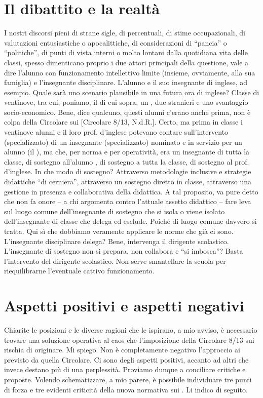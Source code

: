 \section*{Il dibattito e la realtà}
I nostri discorsi pieni di strane sigle, di percentuali, di stime occupazionali, di valutazioni entusiastiche o apocalittiche, di considerazioni di “pancia” o “politiche”, di punti di vista interni o molto lontani dalla quotidiana vita delle classi, spesso dimenticano proprio i due attori principali della questione, vale a dire l'alunno con funzionamento intellettivo limite (insieme, ovviamente, alla sua famiglia) e l'insegnante disciplinare.
L'alunno  e il suo insegnante di inglese, ad esempio. Quale sarà uno scenario plausibile in una futura ora di inglese? Classe di ventinove, tra cui, poniamo, il  di cui sopra, un , due stranieri e uno svantaggio socio-economico. Bene, dice qualcuno, questi alunni c'erano anche prima, non è colpa della Circolare sui  [Circolare 8/13, N.d.R.]. Certo, ma prima in classe i ventinove alunni e il loro prof. d'inglese potevano contare sull'intervento (specializzato) di un insegnante (specializzato) nominato e in servizio per un alunno (il ), ma che, per norma e per operatività, era un insegnante di tutta la classe, di sostegno all'alunno , di sostegno a tutta la classe, di sostegno al prof. d'inglese.
In che modo di sostegno? Attraverso metodologie inclusive e strategie didattiche “di cerniera”, attraverso un sostegno diretto in classe, attraverso una gestione in presenza e collaborativa della didattica.
A tal proposito, va pure detto che non fa onore – a chi argomenta contro l'attuale assetto didattico – fare leva sul luogo comune dell'insegnante di sostegno che si isola o viene isolato dell'insegnante di classe che delega ed esclude. Poiché di luogo comune davvero si tratta. Qui sì che dobbiamo veramente applicare le norme che già ci sono. L'insegnante disciplinare delega? Bene, intervenga il dirigente scolastico. L'insegnante di sostegno non si prepara, non collabora e “si imbosca”? Basta l'intervento del dirigente scolastico. Non serve smantellare la scuola per riequilibrarne l'eventuale cattivo funzionamento.
\section*{Aspetti positivi e aspetti negativi}
Chiarite le posizioni e le diverse ragioni che le ispirano, a mio avviso, è necessario trovare una soluzione operativa al caos che l'imposizione della Circolare 8/13 sui  rischia di originare.
Mi spiego. Non è completamente negativo l'approccio ai  previsto da quella Circolare. Ci sono degli aspetti positivi, accanto ad altri che invece destano più di una perplessità. Proviamo dunque a conciliare critiche e proposte.
Volendo schematizzare, a mio parere, è possibile individuare tre punti di forza e tre evidenti criticità della nuova normativa sui . Li indico di seguito.
